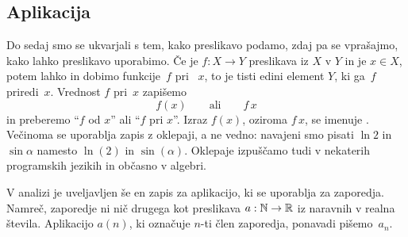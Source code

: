 \subsection{Aplikacija}
\label{sec:aplikacija}


Do sedaj smo se ukvarjali s tem, kako preslikavo podamo, zdaj pa se vprašajmo, kako lahko
preslikavo uporabimo. Če je $f : X \to Y$ preslikava iz $X$ v $Y$ in je $x \in X$, potem
lahko  in dobimo  funkcije~$f$ pri
~$x$, to je tisti edini element $Y$, ki ga~$f$ priredi~$x$. Vrednost $f$
pri~$x$ zapišemo
%
\begin{equation*}
  f(x)
  \qquad\text{ali}\qquad
  f\,x
\end{equation*}
%
in preberemo ``$f$ od $x$'' ali ``$f$ pri $x$''. Izraz $f(x)$, oziroma $f\,x$, se imenuje
. Večinoma se uporablja zapis z oklepaji, a ne vedno: navajeni smo pisati
$\ln 2$ in $\sin \alpha$ namesto $\ln(2)$ in $\sin(\alpha)$. Oklepaje izpuščamo tudi v
nekaterih programskih jezikih in občasno v algebri.

V analizi je uveljavljen še en zapis za aplikacijo, ki se uporablja za zaporedja. Namreč,
zaporedje ni nič drugega kot preslikava $a : \mathbb{N} \to \mathbb{R}$ iz naravnih v realna števila.
Aplikacijo $a(n)$, ki označuje $n$-ti člen zaporedja, ponavadi pišemo~$a_n$.









